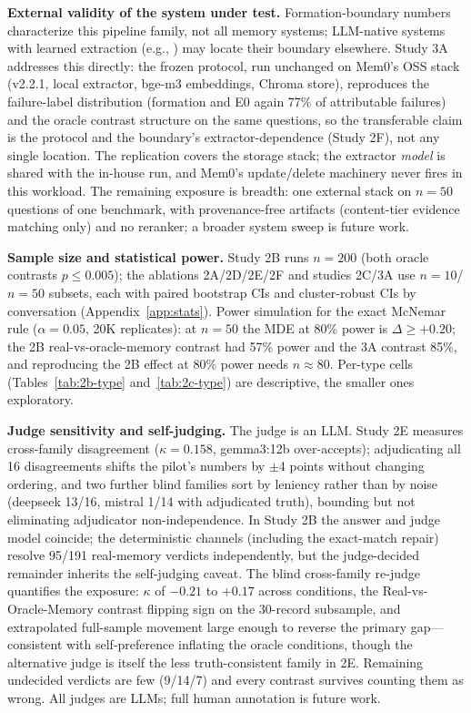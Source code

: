 \documentclass[11pt]{article}
\begin{document}
\textbf{External validity of the system under test.} Formation-boundary
numbers characterize this pipeline family, not all memory systems;
LLM-native systems with learned extraction (e.g.,
\cite{mem0,memtier,memtrace}) may locate their boundary elsewhere.
Study 3A addresses this directly: the frozen protocol, run unchanged on
Mem0's OSS stack (v2.2.1, local extractor, bge-m3 embeddings, Chroma
store), reproduces the failure-label distribution (formation and E0
again 77\% of attributable failures) and the oracle contrast structure
on the same questions, so the transferable claim is the protocol and
the boundary's extractor-dependence (Study 2F), not any single
location. The replication covers the storage stack; the extractor
\emph{model} is shared with the in-house run, and Mem0's update/delete
machinery never fires in this workload. The remaining exposure is
breadth: one external stack on
$n{=}50$ questions of one benchmark, with provenance-free artifacts
(content-tier evidence matching only) and no reranker; a broader
system sweep is future work.

\textbf{Sample size and statistical power.} Study 2B runs $n{=}200$ (both
oracle contrasts $p{\leq}0.005$); the ablations 2A/2D/2E/2F and studies
2C/3A use $n{=}10$/$n{=}50$ subsets, each with paired bootstrap CIs and
cluster-robust CIs by conversation (Appendix~\ref{app:stats}). Power
simulation for the exact McNemar rule ($\alpha{=}0.05$, 20K replicates):
at $n{=}50$ the MDE at 80\% power is $\Delta{\ge}+0.20$; the 2B
real-vs-oracle-memory contrast had 57\% power and the 3A contrast 85\%,
and reproducing the 2B effect at 80\% power needs $n{\approx}80$.
Per-type cells (Tables~\ref{tab:2b-type} and~\ref{tab:2c-type}) are
descriptive, the smaller ones exploratory.

\textbf{Judge sensitivity and self-judging.} The judge is an LLM. Study
2E measures cross-family disagreement ($\kappa{=}0.158$, gemma3:12b
over-accepts); adjudicating all 16 disagreements shifts the pilot's
numbers by $\pm$4 points without changing ordering, and two further
blind families sort by leniency rather than by noise (deepseek 13/16,
mistral 1/14 with adjudicated truth), bounding but not eliminating
adjudicator non-independence. In Study 2B the answer and judge model
coincide; the deterministic channels (including the exact-match repair)
resolve 95/191 real-memory
verdicts independently, but the judge-decided remainder inherits the
self-judging caveat. The blind cross-family re-judge quantifies the
exposure: $\kappa$ of $-0.21$ to $+0.17$ across conditions, the
Real-vs-Oracle-Memory contrast flipping sign on the
30-record subsample, and extrapolated full-sample movement large
enough to reverse the primary gap---consistent with self-preference
inflating the oracle conditions, though the alternative judge is
itself the less truth-consistent family in 2E. Remaining undecided
verdicts are few (9/14/7) and every contrast survives counting them as
wrong. All judges are LLMs; full human annotation is future work.
\end{document}
